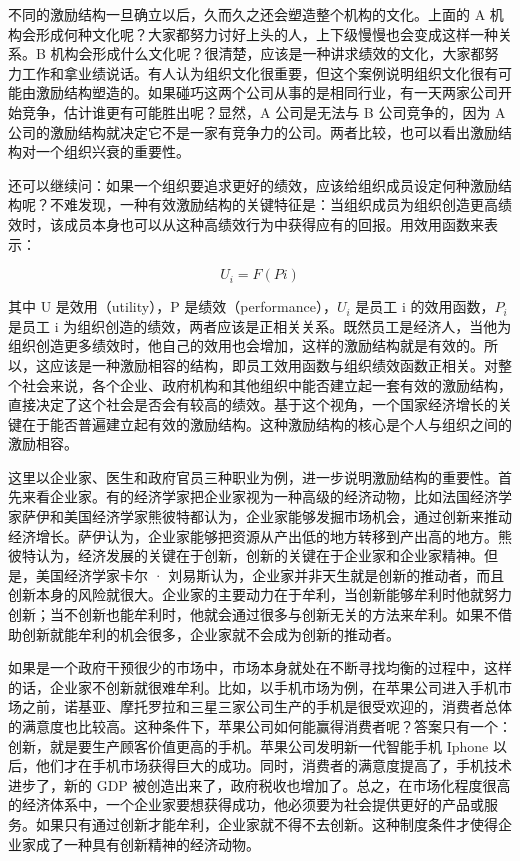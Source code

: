 不同的激励结构一旦确立以后，久而久之还会塑造整个机构的文化。上面的 A 机构会形成何种文化呢？大家都努力讨好上头的人，上下级慢慢也会变成这样一种关系。B 机构会形成什么文化呢？很清楚，应该是一种讲求绩效的文化，大家都努力工作和拿业绩说话。有人认为组织文化很重要，但这个案例说明组织文化很有可能由激励结构塑造的。如果碰巧这两个公司从事的是相同行业，有一天两家公司开始竞争，估计谁更有可能胜出呢？显然，A 公司是无法与 B 公司竞争的，因为 A 公司的激励结构就决定它不是一家有竞争力的公司。两者比较，也可以看出激励结构对一个组织兴衰的重要性。

还可以继续问：如果一个组织要追求更好的绩效，应该给组织成员设定何种激励结构呢？不难发现，一种有效激励结构的关键特征是：当组织成员为组织创造更高绩效时，该成员本身也可以从这种高绩效行为中获得应有的回报。用效用函数来表示：

\[U_i = F(Pi)\]

其中 U 是效用（utility），P 是绩效（performance），$U_i$ 是员工 i 的效用函数，$P_i$ 是员工 i 为组织创造的绩效，两者应该是正相关关系。既然员工是经济人，当他为组织创造更多绩效时，他自己的效用也会增加，这样的激励结构就是有效的。所以，这应该是一种激励相容的结构，即员工效用函数与组织绩效函数正相关。对整个社会来说，各个企业、政府机构和其他组织中能否建立起一套有效的激励结构，直接决定了这个社会是否会有较高的绩效。基于这个视角，一个国家经济增长的关键在于能否普遍建立起有效的激励结构。这种激励结构的核心是个人与组织之间的激励相容。

这里以企业家、医生和政府官员三种职业为例，进一步说明激励结构的重要性。首先来看企业家。有的经济学家把企业家视为一种高级的经济动物，比如法国经济学家萨伊和美国经济学家熊彼特都认为，企业家能够发掘市场机会，通过创新来推动经济增长。萨伊认为，企业家能够把资源从产出低的地方转移到产出高的地方。熊彼特认为，经济发展的关键在于创新，创新的关键在于企业家和企业家精神。但是，美国经济学家卡尔 · 刘易斯认为，企业家并非天生就是创新的推动者，而且创新本身的风险就很大。企业家的主要动力在于牟利，当创新能够牟利时他就努力创新；当不创新也能牟利时，他就会通过很多与创新无关的方法来牟利。如果不借助创新就能牟利的机会很多，企业家就不会成为创新的推动者。

如果是一个政府干预很少的市场中，市场本身就处在不断寻找均衡的过程中，这样的话，企业家不创新就很难牟利。比如，以手机市场为例，在苹果公司进入手机市场之前，诺基亚、摩托罗拉和三星三家公司生产的手机是很受欢迎的，消费者总体的满意度也比较高。这种条件下，苹果公司如何能赢得消费者呢？答案只有一个：创新，就是要生产顾客价值更高的手机。苹果公司发明新一代智能手机 Iphone 以后，他们才在手机市场获得巨大的成功。同时，消费者的满意度提高了，手机技术进步了，新的 GDP 被创造出来了，政府税收也增加了。总之，在市场化程度很高的经济体系中，一个企业家要想获得成功，他必须要为社会提供更好的产品或服务。如果只有通过创新才能牟利，企业家就不得不去创新。这种制度条件才使得企业家成了一种具有创新精神的经济动物。

